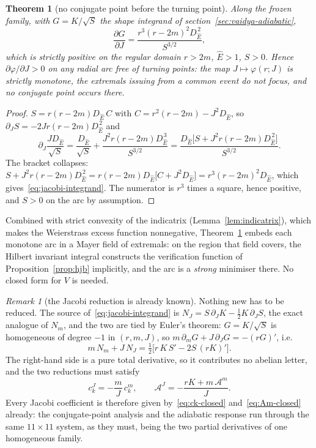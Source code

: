 \documentclass[12pt]{iopart}
\newcommand{\Ehat}{\hat E}
\theoremstyle{plain}
\theoremstyle{definition}
\theoremstyle{plain}
\newtheorem{auxtheorem}[auxlemma]{Theorem}
\theoremstyle{remark}
\newtheorem*{remark}{Remark}
\begin{document}
\begin{auxtheorem}[no conjugate point before the turning point]\label{thm:jacobi}
Along the frozen family, with $G=K/\sqrt S$ the shape integrand of
section~\ref{sec:vaidya-adiabatic},
\begin{equation}
   \frac{\partial G}{\partial J}=\frac{r^3(r-2m)^2D_{\Ehat}^{\,2}}{S^{3/2}},
   \label{eq:jacobi-integrand}
\end{equation}
which is strictly positive on the regular domain $r>2m$, $\Ehat>1$, $S>0$. Hence
$\partial\varphi/\partial J>0$ on any radial arc free of turning points: the map
$J\mapsto\varphi(r;J)$ is strictly monotone, the extremals issuing from a common event do
not focus, and no conjugate point occurs there.
\end{auxtheorem}

\begin{proof}
$S=r(r-2m)D_{\Ehat}\,C$ with $C=r^2(r-2m)-J^2D_{\Ehat}$, so
$\partial_JS=-2Jr(r-2m)D_{\Ehat}^{\,2}$ and
\[
   \partial_J\frac{JD_{\Ehat}}{\sqrt S}
   =\frac{D_{\Ehat}}{\sqrt S}+\frac{J^2r(r-2m)D_{\Ehat}^{\,3}}{S^{3/2}}
   =\frac{D_{\Ehat}\big[S+J^2r(r-2m)D_{\Ehat}^{\,2}\big]}{S^{3/2}} .
\]
The bracket collapses: $S+J^2r(r-2m)D_{\Ehat}^{\,2}
=r(r-2m)D_{\Ehat}\big[C+J^2D_{\Ehat}\big]=r^3(r-2m)^2D_{\Ehat}$, which
gives~\eqref{eq:jacobi-integrand}. The numerator is $r^3$ times a square, hence positive,
and $S>0$ on the arc by assumption.
\end{proof}

Combined with strict convexity of the indicatrix (Lemma~\ref{lem:indicatrix}), which makes
the Weierstrass excess function nonnegative, Theorem~\ref{thm:jacobi} embeds each monotone
arc in a Mayer field of extremals: on the region that field covers, the Hilbert invariant
integral constructs the verification function of Proposition~\ref{prop:hjb} implicitly, and
the arc is a \emph{strong} minimiser there. No closed form for $V$ is needed.

\begin{remark}[the Jacobi reduction is already known]\label{rem:jacobi-euler}
Nothing new has to be reduced. The source of~\eqref{eq:jacobi-integrand} is
$N_J=S\,\partial_JK-\tfrac12K\,\partial_JS$, the exact analogue of $N_m$, and the two are
tied by Euler's theorem: $G=K/\sqrt S$ is homogeneous of degree $-1$ in $(r,m,J)$, so
$m\,\partial_mG+J\,\partial_JG=-(rG)'$, i.e.
\begin{equation}
   m\,N_m+J\,N_J=\tfrac12\big[r\,K\,S'-2S\,(rK)'\big].
   \label{eq:jacobi-euler}
\end{equation}
The right-hand side is a pure total derivative, so it contributes no abelian letter, and
the two reductions must satisfy
\begin{equation}
   c^J_k=-\frac{m}{J}\,c^m_k,\qquad
   \mathcal{A}^J=-\frac{rK+m\,\mathcal{A}^m}{J} .
   \label{eq:jacobi-coeffs}
\end{equation}
Every Jacobi coefficient is therefore given by~\eqref{eq:ck-closed}
and~\eqref{eq:Am-closed} already: the conjugate-point analysis and the adiabatic response
run through the same $11\times11$ system, as they must, being the two partial derivatives
of one homogeneous family.
\end{remark}
\end{document}
